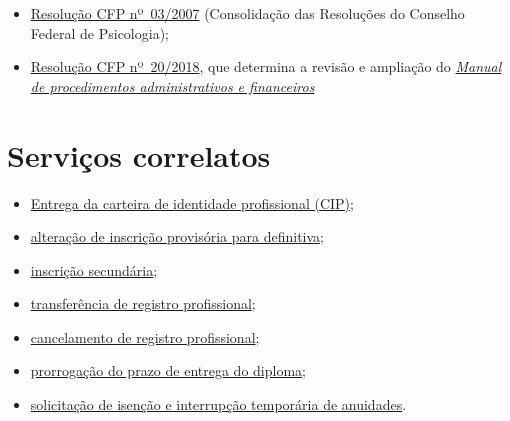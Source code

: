 \begin{itemize}
  \item  \href{https://atosoficiais.com.br/cfp/resolucao-administrativa-financeira-n-3-2007-institui-a-consolidacao-das-resolucoes-do-conselho-federal-de-psicologia?origin=instituicao&q=resolu\%C3\%A7\%C3\%A3o\%203/2007}{Resolução  CFP nº~03/2007} (Consolidação das Resoluções do Conselho Federal de  Psicologia);
  \item  \href{https://transparencia.cfp.org.br/wp-content/uploads/sites/7/2020/05/Manual-de-Procedimentos-Administrativos-e-Financeiro-CFP-RES-20.2018.pdf}{\href{https://atosoficiais.com.br/cfp/resolucao-administrativa-financeira-n-20-2018-altera-o-manual-de-procedimentos-administrativo-e-financeiro-do-sistema-conselhos-de-psicologia-anexo-da-resolucao-cfp-n-202018-a-resolucao-cfp-n-03-2007-a-resolucao-cfp-n-16-2019-e-da-outras-providencias}{Resolução  CFP nº~20/2018}}, que determina a revisão e ampliação do  \href{https://transparencia.cfp.org.br/wp-content/uploads/sites/7/2020/05/Manual-de-Procedimentos-Administrativos-e-Financeiro-CFP-RES-20.2018.pdf}{\emph{Manual  de procedimentos administrativos e financeiros}}
\end{itemize}

\section{Serviços correlatos}

\begin{itemize}
  \item  \hyperref[chap:pf-cip]{Entrega  da carteira de identidade profissional (CIP)};
  \item  \hyperref[chap:pf-inscricao_definitiva]{alteração  de inscrição provisória para definitiva};
  \item  \hyperref[chap:pf-secundaria]{inscrição secundária};
  \item  \hyperref[chap:pf-transferencia]{transferência de  registro profissional};
  \item  \hyperref[chap:pf-cancelamento]{cancelamento de  registro profissional};
  \item  \hyperref[chap:pf-prorroga_diploma]{prorrogação  do prazo de entrega do diploma};
  \item  \hyperref[chap:pf-isencao]{solicitação  de isenção e interrupção temporária de anuidades}.
\end{itemize}

\sumario